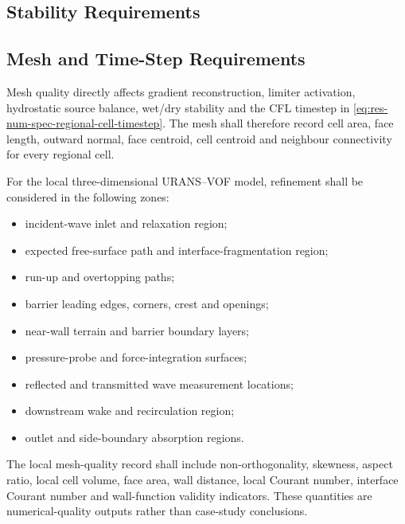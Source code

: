 
\subsection{Stability Requirements}
\label{sec:res-num-msh-stability-requirements}


\subsection{Mesh and Time-Step Requirements}
\label{sec:res-num-msh-mesh-time-step-requirements}

Mesh quality directly affects gradient reconstruction, limiter
activation, hydrostatic source balance, wet/dry stability and the CFL
timestep in \cref{eq:res-num-spec-regional-cell-timestep}. The mesh
shall therefore record cell area, face length, outward normal, face
centroid, cell centroid and neighbour connectivity for every regional
cell.

For the local three-dimensional URANS--VOF model, refinement shall be
considered in the following zones:

\begin{itemize}
  \item incident-wave inlet and relaxation region;
  \item expected free-surface path and interface-fragmentation region;
  \item run-up and overtopping paths;
  \item barrier leading edges, corners, crest and openings;
  \item near-wall terrain and barrier boundary layers;
  \item pressure-probe and force-integration surfaces;
  \item reflected and transmitted wave measurement locations;
  \item downstream wake and recirculation region;
  \item outlet and side-boundary absorption regions.
\end{itemize}

The local mesh-quality record shall include non-orthogonality, skewness,
aspect ratio, local cell volume, face area, wall distance, local
Courant number, interface Courant number and wall-function validity
indicators. These quantities are numerical-quality outputs rather than
case-study conclusions.


